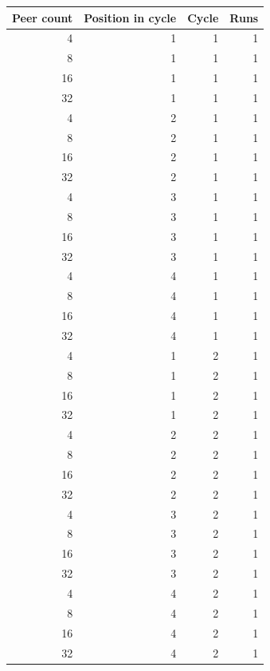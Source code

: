 \begin{tabular}{rrrr}
\toprule
Peer count & Position in cycle & Cycle & Runs \\
\midrule
4 & 1 & 1 & 1 \\
8 & 1 & 1 & 1 \\
16 & 1 & 1 & 1 \\
32 & 1 & 1 & 1 \\
4 & 2 & 1 & 1 \\
8 & 2 & 1 & 1 \\
16 & 2 & 1 & 1 \\
32 & 2 & 1 & 1 \\
4 & 3 & 1 & 1 \\
8 & 3 & 1 & 1 \\
16 & 3 & 1 & 1 \\
32 & 3 & 1 & 1 \\
4 & 4 & 1 & 1 \\
8 & 4 & 1 & 1 \\
16 & 4 & 1 & 1 \\
32 & 4 & 1 & 1 \\
4 & 1 & 2 & 1 \\
8 & 1 & 2 & 1 \\
16 & 1 & 2 & 1 \\
32 & 1 & 2 & 1 \\
4 & 2 & 2 & 1 \\
8 & 2 & 2 & 1 \\
16 & 2 & 2 & 1 \\
32 & 2 & 2 & 1 \\
4 & 3 & 2 & 1 \\
8 & 3 & 2 & 1 \\
16 & 3 & 2 & 1 \\
32 & 3 & 2 & 1 \\
4 & 4 & 2 & 1 \\
8 & 4 & 2 & 1 \\
16 & 4 & 2 & 1 \\
32 & 4 & 2 & 1 \\
\bottomrule
\end{tabular}